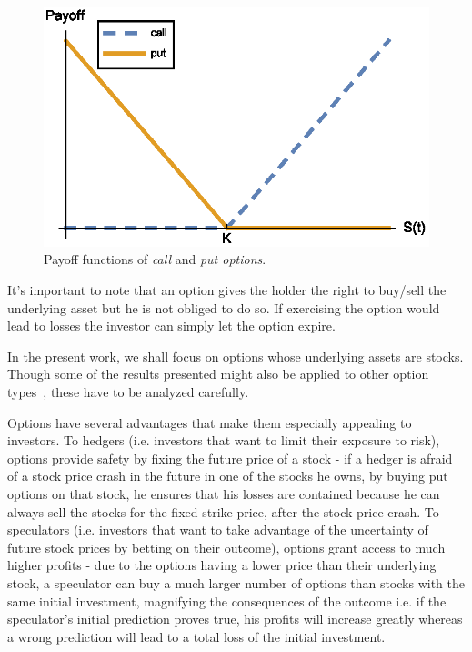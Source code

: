 \documentclass[a4paper,twocolumn,aps,prd,longbibliography,superscriptaddress]{revtex4-1}
\begin{document}
\begin{figure}[H]
    \centering
      \includegraphics[width=.9\columnwidth]{Payoff.eps}
      \caption{Payoff functions of \textit{call} and \textit{put options}.}\label{fig:Payoff}
    \end{figure}

It's important to note that an option gives the holder the right to buy/sell the underlying asset but he is not obliged to do so. If exercising the option would lead to losses the investor can simply let the option expire.

In the present work, we shall focus on options whose underlying assets are stocks. Though some of the results presented might also be applied to other option types~\cite{Hull}, these have to be analyzed carefully.


Options have several advantages that make them especially appealing to investors.
To hedgers (i.e. investors that want to limit their exposure to risk), options provide safety by fixing the future price of a stock - if a hedger is afraid of a stock price crash in the future in one of the stocks he owns, by buying put options on that stock, he ensures that his losses are contained because he can always sell the stocks for the fixed strike price, after the stock price crash.
To speculators (i.e. investors that want to take advantage of the uncertainty of future stock prices by betting on their outcome), options grant access to much higher profits - due to the options having a lower price than their underlying stock, a speculator can buy a much larger number of options than stocks with the same initial investment, magnifying the consequences of the outcome i.e. if the speculator's initial prediction proves true, his profits will increase greatly whereas a wrong prediction will lead to a total loss of the initial investment.
\end{document}
